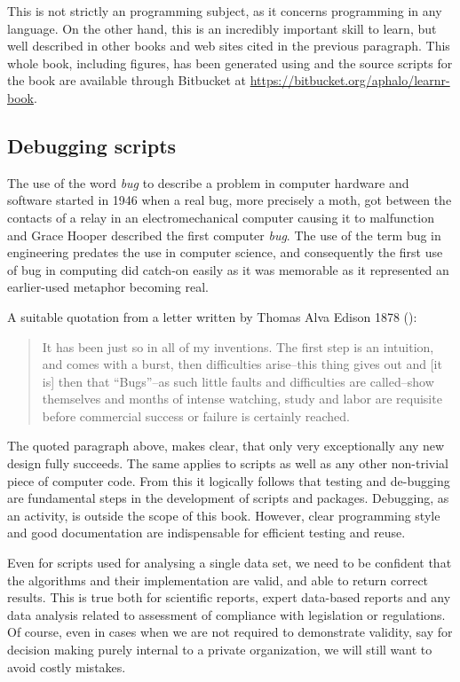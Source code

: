 \documentclass[krantz2]{krantz}\usepackage{knitr}%
\begin{document}
This is not strictly an \Rlang programming subject, as it concerns programming in any language. On the other hand, this is an incredibly important skill to learn, but well described in other books and web sites cited in the previous paragraph. This whole book, including figures, has been generated using  and the source scripts for the book are available through Bitbucket at \url{https://bitbucket.org/aphalo/learnr-book}.

\subsection{Debugging scripts}\label{sec:script:debug}

The use of the word \emph{bug} to describe a problem in computer hardware and software started in 1946 when a real bug, more precisely a moth, got between the contacts of a relay in an electromechanical computer causing it to malfunction and Grace Hooper described the first computer \emph{bug}. The use of the term bug in engineering predates the use in computer science, and consequently the first use of bug in computing did catch-on easily as it was memorable as it represented an earlier-used metaphor becoming real.

A suitable quotation from a letter written by Thomas Alva Edison 1878 (\autocite{Hughes2004}):
\begin{quote}
  It has been just so in all of my inventions. The first step is an intuition, and comes with a burst, then difficulties arise--this thing gives out and [it is] then that ``Bugs''--as such little faults and difficulties are called--show themselves and months of intense watching, study and labor are requisite before commercial success or failure is certainly reached.
\end{quote}

The quoted paragraph above, makes clear, that only very exceptionally any new design fully succeeds. The same applies to \Rlang scripts as well as any other non-trivial piece of computer code. From this it logically follows that testing and de-bugging are fundamental steps in the development of \Rlang scripts and packages. Debugging, as an activity, is outside the scope of this book. However, clear programming style and good documentation are indispensable for efficient testing and reuse.

Even for scripts used for analysing a single data set, we need to be confident that the algorithms and their implementation are valid, and able to return correct results. This is true both for scientific reports, expert data-based reports and any data analysis related to assessment of compliance with legislation or regulations. Of course, even in cases when we are not required to demonstrate validity, say for decision making purely internal to a private organization, we will still want to avoid costly mistakes.
\end{document}
